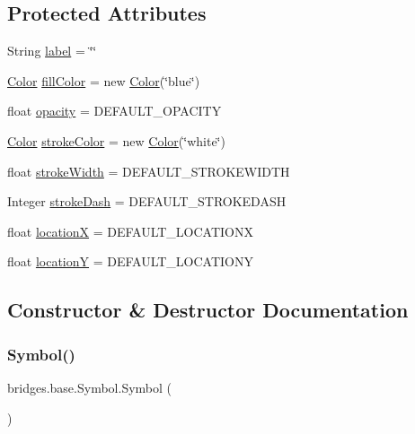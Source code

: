 \subsection*{Protected Attributes}
\begin{DoxyCompactItemize}
\item 
String \hyperlink{classbridges_1_1base_1_1_symbol_ad2adcc82e6a96c2f3c465702502655e9}{label} = \char`\"{}\char`\"{}
\item 
\hyperlink{classbridges_1_1base_1_1_color}{Color} \hyperlink{classbridges_1_1base_1_1_symbol_a44f00712b6c584c7778ed9de4c394cbf}{fill\+Color} = new \hyperlink{classbridges_1_1base_1_1_color}{Color}(\char`\"{}blue\char`\"{})
\item 
float \hyperlink{classbridges_1_1base_1_1_symbol_a92f497d2e6363f20a65f36777846c8e5}{opacity} = D\+E\+F\+A\+U\+L\+T\+\_\+\+O\+P\+A\+C\+I\+TY
\item 
\hyperlink{classbridges_1_1base_1_1_color}{Color} \hyperlink{classbridges_1_1base_1_1_symbol_a51a9a36983b00156284d86ca80cccfb0}{stroke\+Color} = new \hyperlink{classbridges_1_1base_1_1_color}{Color}(\char`\"{}white\char`\"{})
\item 
float \hyperlink{classbridges_1_1base_1_1_symbol_af00affe40d45a600e3b8c79fce6c9505}{stroke\+Width} = D\+E\+F\+A\+U\+L\+T\+\_\+\+S\+T\+R\+O\+K\+E\+W\+I\+D\+TH
\item 
Integer \hyperlink{classbridges_1_1base_1_1_symbol_a04134e835474c4747e334389f00513c0}{stroke\+Dash} = D\+E\+F\+A\+U\+L\+T\+\_\+\+S\+T\+R\+O\+K\+E\+D\+A\+SH
\item 
float \hyperlink{classbridges_1_1base_1_1_symbol_a0765e86b476d2309d0da02e12b0fc4c9}{locationX} = D\+E\+F\+A\+U\+L\+T\+\_\+\+L\+O\+C\+A\+T\+I\+O\+NX
\item 
float \hyperlink{classbridges_1_1base_1_1_symbol_adfb7811be513e5cd0f37a783062e0109}{locationY} = D\+E\+F\+A\+U\+L\+T\+\_\+\+L\+O\+C\+A\+T\+I\+O\+NY
\end{DoxyCompactItemize}


\subsection{Constructor \& Destructor Documentation}
\mbox{\label{classbridges_1_1base_1_1_symbol_a5449cffb7ffdbab093a110957158acc6}} 
\subsubsection{\texorpdfstring{Symbol()}{Symbol()}}
{\footnotesize\ttfamily bridges.\+base.\+Symbol.\+Symbol (\begin{DoxyParamCaption}{ }\end{DoxyParamCaption})}

